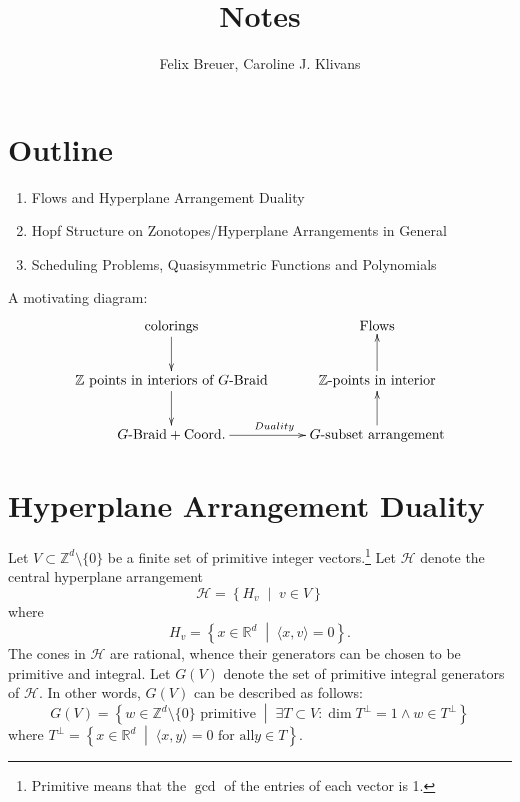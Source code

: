 \documentclass[11pt,letter]{amsart}
\title{Notes}
\author{Felix Breuer, Caroline J. Klivans}
\newcommand{\RR}{\mathbb{R}}
\newcommand{\ZZ}{\mathbb{Z}}
\newcommand{\HHH}{\mathcal{H}}
\newcommand{\sprod}[2]{\langle #1, #2 \rangle}
\renewcommand{\dim}{\mathsf{dim}\ }
\renewcommand{\dim}{\operatorname{dim}}
\newcommand{\mset}[2]{ \left\{ #1 \; \middle| \; #2 \right\}}
\begin{document}
\maketitle


\section{Outline}

\begin{enumerate}
\item Flows and Hyperplane Arrangement Duality
\item Hopf Structure on Zonotopes/Hyperplane Arrangements in General
\item Scheduling Problems, Quasisymmetric Functions and Polynomials
\end{enumerate}


\noindent A motivating diagram:
\begin{equation*} \label{big_picture}
\xymatrix{
\textrm{colorings}  \dto &\textrm{Flows}\\
 \textrm{$\mathbb{Z}$ points in interiors of $G$-Braid} \dto & \textrm{$\mathbb{Z}$-points in interior} \uto\\
 \textrm{$G$-Braid} + \textrm{Coord.} \rto^{Duality}  & \textrm{$G$-subset arrangement} \uto}
\end{equation*}



\section{Hyperplane Arrangement Duality}

Let $V\subset \ZZ^d\setminus\{0\}$ be a finite set of primitive integer vectors.\footnote{Primitive means that the $\gcd$ of the entries of each vector is 1.} Let $\HHH$ denote the central hyperplane arrangement
\[
\HHH = \mset{H_v}{v\in V}
\]
where
\[
H_v = \mset{x\in \RR^d}{\sprod{x}{v}=0}.
\]
The cones in $\HHH$ are rational, whence their generators can be chosen to be primitive and integral. Let $G(V)$ denote the set of primitive integral generators of $\HHH$. In other words, $G(V)$ can be described as follows:
\[
 G(V) = \mset{w\in\ZZ^d\setminus\{0\}\text{ primitive}}{\exists T\subset V: \dim T^\perp = 1 \wedge w\in T^\perp}
\]
where $T^\perp = \mset{x\in\RR^d}{\sprod{x}{y}=0 \text{ for all} y\in T}$.
\end{document}
